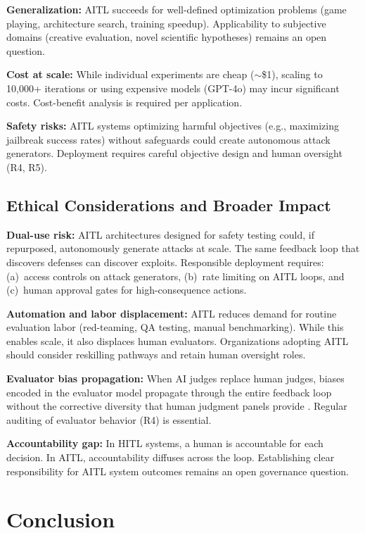 \documentclass[11pt]{article}
\begin{document}
\textbf{Generalization:} AITL succeeds for well-defined optimization problems (game playing, architecture search, training speedup). Applicability to subjective domains (creative evaluation, novel scientific hypotheses) remains an open question.

\textbf{Cost at scale:} While individual experiments are cheap ($\sim$\$1), scaling to 10,000+ iterations or using expensive models (GPT-4o) may incur significant costs. Cost-benefit analysis is required per application.

\textbf{Safety risks:} AITL systems optimizing harmful objectives (e.g., maximizing jailbreak success rates) without safeguards could create autonomous attack generators. Deployment requires careful objective design and human oversight (R4, R5).

\subsection{Ethical Considerations and Broader Impact}

\textbf{Dual-use risk:} AITL architectures designed for safety testing could, if repurposed, autonomously generate attacks at scale. The same feedback loop that discovers defenses can discover exploits. Responsible deployment requires: (a)~access controls on attack generators, (b)~rate limiting on AITL loops, and (c)~human approval gates for high-consequence actions.

\textbf{Automation and labor displacement:} AITL reduces demand for routine evaluation labor (red-teaming, QA testing, manual benchmarking). While this enables scale, it also displaces human evaluators. Organizations adopting AITL should consider reskilling pathways and retain human oversight roles.

\textbf{Evaluator bias propagation:} When AI judges replace human judges, biases encoded in the evaluator model propagate through the entire feedback loop without the corrective diversity that human judgment panels provide \citep{wang2023llm_not_fair}. Regular auditing of evaluator behavior (R4) is essential.

\textbf{Accountability gap:} In HITL systems, a human is accountable for each decision. In AITL, accountability diffuses across the loop. Establishing clear responsibility for AITL system outcomes remains an open governance question.

\section{Conclusion}
\label{sec:conclusion}
\end{document}
